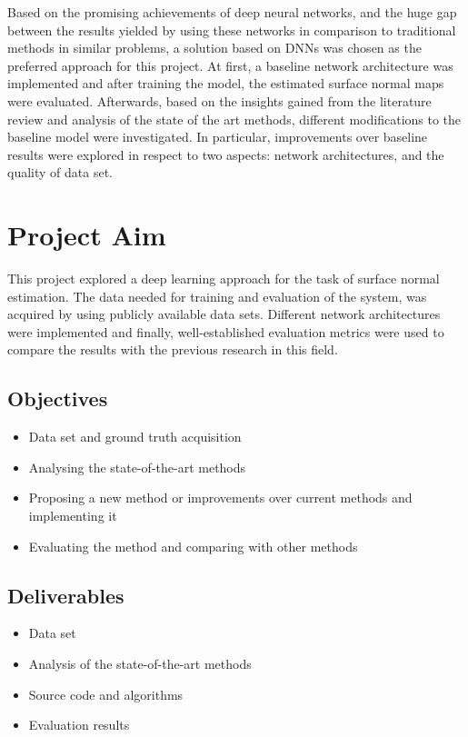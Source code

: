 Based on the promising achievements of deep neural networks, and the huge gap between the results yielded by using these networks in comparison to traditional methods in similar problems, a solution based on DNNs was chosen as the preferred approach for this project. At first, a baseline network architecture was implemented and after training the model, the estimated surface normal maps were evaluated.  Afterwards, based on the insights gained from the literature review and analysis of the state of the art methods, different modifications to the baseline model were investigated. In particular, improvements over baseline results were explored in respect to two aspects: network architectures, and the quality of data set.   

\section{Project Aim}

This project explored a deep learning approach for the task of surface normal estimation. The data needed for training and evaluation of the system, was acquired by using publicly available data sets. Different network architectures were implemented and finally, well-established evaluation metrics were used to compare the results with the previous research in this field. 

\subsection{Objectives}

\begin{itemize}
    \item Data set and ground truth acquisition
    \item Analysing the state-of-the-art methods
    \item Proposing a new method or improvements over current methods and
implementing it
    \item Evaluating the method and comparing with other methods
\end{itemize}

\subsection{Deliverables}

\begin{itemize}
    \item Data set
    \item Analysis of the state-of-the-art methods
    \item Source code and algorithms
    \item Evaluation results
\end{itemize}

